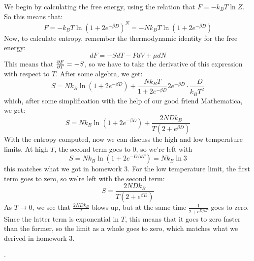 \documentclass[10pt]{article}
\begin{document}
\begin{enumerate}[label=\alph*)]
			\begin{solution}
				We begin by calculating the free energy, using the relation that \(F = -k_BT \ln Z\). 
				So this means that:
				\[
				F = -k_BT \ln \left( 1 + 2e^{-\beta D} \right)^{N} = -N k_BT \ln\left( 1 + 2e^{-\beta D} \right) 
				\] 
				Now, to calculate entropy, remember the thermodynamic identity for the free energy:
				\[
				dF = -S dT - P dV + \mu dN
				\] 
				This means that \(\pdv{F}{T} = -S\), so we have to take the derivative of this expression 
				with respect to \(T\). After some algebra, we get:
				\[
				S = Nk_B \ln \left( 1 + 2e^{-\beta D} \right) + 
				\frac{Nk_BT}{1 + 2e^{-\beta D}}2e^{-\beta D} \cdot \frac{-D}{k_BT^2}
				\] 
				which, after some simplification with the help of our good friend Mathematica, 
				we get:
				\[
				S = Nk_B \ln\left( 1 + 2e^{-\beta D} \right) + \frac{2ND k_B}{T(2 + e^{\beta D})}
				\] 
				With the entropy computed, now we can discuss the high and low temperature limits. 
				At high \(T\), the second term goes to 0, so we're left with 
				\[
				S = Nk_B \ln (1 + 2e^{-D / kT}) = Nk_B \ln 3
				\] 
				this matches what we got in homework 3. For the low temperature limit, the first term 
				goes to zero, so we're left with the second term:
				\[
				S = \frac{2ND k_B}{T\left( 2 + e^{\beta D} \right) }
				\] 
				As \(T \to 0\), we see that \(\frac{2ND k_B}{T}\) blows up, but at the same time 
				\(\frac{1}{2 + e^{ D / kT}}\) goes to zero. Since the latter term is exponential in 
				\(T\), this means that it goes to zero faster than the former, so the limit 
				as a whole goes to zero, which matches what we derived in homework 3. 
			\end{solution}
	\end{enumerate}	
.
\end{document}
